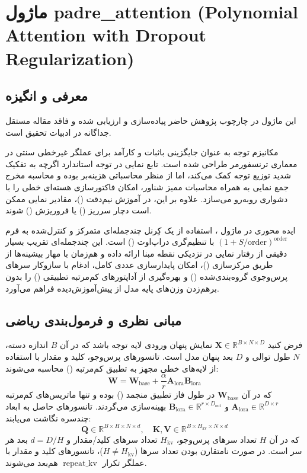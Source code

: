 \section{ماژول padre\_attention (Polynomial Attention with Dropout Regularization)}
\label{sec:module_padre_attention}

\subsection{معرفی و انگیزه}
این ماژول در چارچوب پژوهش حاضر پیاده‌سازی و ارزیابی شده و فاقد مقاله مستقل جداگانه در ادبیات تحقیق است.

مکانیزم توجه  به عنوان جایگزینی باثبات و کارآمد برای عملگر غیرخطی سنتی  در معماری ترنسفورمر طراحی شده است. تابع نمایی در توجه استاندارد اگرچه به تفکیک شدید توزیع توجه کمک می‌کند، اما از منظر محاسباتی هزینه‌بر بوده و محاسبه مخرج جمع نمایی به همراه محاسبات ممیز شناور، امکان فاکتورسازی هسته‌ای خطی را با دشواری روبه‌رو می‌سازد. علاوه بر این، در آموزش نیم‌دقت ()، مقادیر نمایی ممکن است دچار سرریز () یا فروریزش () شوند.

ایده محوری در ماژول ، استفاده از یک کِرنل چندجمله‌ای متمرکز و کنترل‌شده به فرم $(1 + S/\text{order})^{\text{order}}$ با تنظیم‌گری دراپ‌اوت () است. این چندجمله‌ای تقریب بسیار دقیقی از رفتار نمایی در نزدیکی نقطه مبنا ارائه داده و هم‌زمان با مهار بیشینه‌ها از طریق مرکزسازی ()، امکان پایدارسازی عددی کامل، ادغام با سازوکار سرهای پرس‌وجوی گروه‌بندی‌شده () و بهره‌گیری از آداپتورهای کم‌مرتبه تطبیقی () را بدون برهم‌زدن وزن‌های پایه مدل از پیش‌آموزش‌دیده فراهم می‌آورد.

\subsection{مبانی نظری و فرمول‌بندی ریاضی}
فرض کنید $\mathbf{X} \in \mathbb{R}^{B \times N \times D}$ نمایش پنهان ورودی لایه توجه باشد که در آن $B$ اندازه دسته، $N$ طول توالی و $D$ بعد پنهان مدل است. تانسورهای پرس‌وجو، کلید و مقدار با استفاده از لایه‌های خطی مجهز به تطبیق کم‌مرتبه () محاسبه می‌شوند:
\begin{equation}
\mathbf{W} = \mathbf{W}_{\text{base}} + \frac{\alpha}{r} \mathbf{A}_{\text{lora}} \mathbf{B}_{\text{lora}}
\end{equation}
که در آن $\mathbf{W}_{\text{base}}$ در طول فاز تطبیق منجمد () بوده و تنها ماتریس‌های کم‌مرتبه $\mathbf{A}_{\text{lora}} \in \mathbb{R}^{D \times r}$ و $\mathbf{B}_{\text{lora}} \in \mathbb{R}^{r \times D_{\text{out}}}$ بهینه‌سازی می‌گردند. تانسورهای حاصل به ابعاد چندسره نگاشت می‌یابند:
\begin{equation}
\mathbf{Q} \in \mathbb{R}^{B \times H \times N \times d}, \quad \mathbf{K}, \mathbf{V} \in \mathbb{R}^{B \times H_{\text{kv}} \times N \times d}
\end{equation}
که در آن $H$ تعداد سرهای پرس‌وجو، $H_{\text{kv}}$ تعداد سرهای کلید/مقدار و $d = D/H$ بعد هر سر است. در صورت نامتقارن بودن تعداد سرها ($H \ne H_{\text{kv}}$)، تانسورهای کلید و مقدار با عملگر تکرار $\operatorname{repeat\_kv}$ هم‌بعد می‌شوند.

